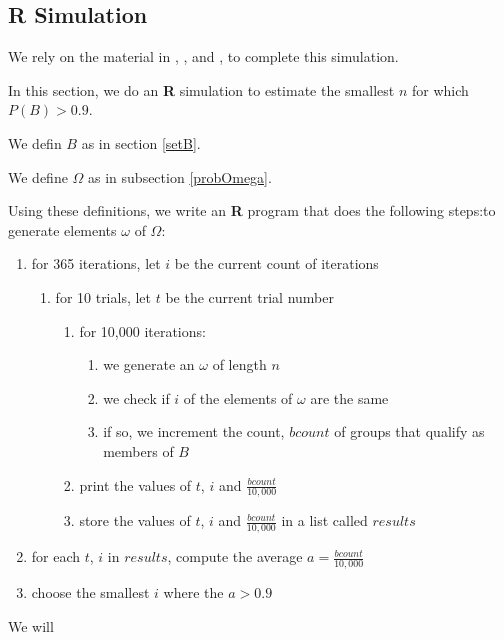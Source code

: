\documentclass[a4paper,11pt]{article}
\begin{document}
\subsection{\textbf{\textsf{R}} Simulation}

We rely on the material in \cite{stackCheckEltsEq}, \cite{rtut1A}, and
\cite{rtut1B}, \cite{RDummies} to complete this simulation.

In this section, we do an \textbf{\textsf{R}} simulation to estimate the
smallest $n$ for which $P\left( B \right) > 0.9$.

We defin $B$ as in section \ref{setB}.

We define $\Omega$ as in subsection \ref{probOmega}.

Using these definitions, we write an \textbf{\textsf{R}} program that 
does the following steps:to generate elements $\omega$ of
$\Omega$:{}
\begin{enumerate}
  \item for 365 iterations, let $i$ be the current count of iterations
  \begin{enumerate}
    \item for 10 trials, let $t$ be the current trial number
    \begin{enumerate}
      \item for 10,000 iterations:
      \begin{enumerate}
        \item we generate an $\omega$ of length $n$
        \item we check if $i$ of the elements of $\omega$ are the same
        \item if so, we increment the count, $bcount$ of groups that qualify as members of $B$
      \end{enumerate}
      \item print the values of $t$, $i$ and $\frac{bcount}{10,000}$
      \item store the values of $t$, $i$ and $\frac{bcount}{10,000}$ in a list called $results$
    \end{enumerate}
  \end{enumerate}
  \item for each $t$, $i$ in $results$, compute the average $a = \frac{bcount}{10,000}$ 
  \item choose the smallest $i$ where the $a > 0.9$
\end{enumerate}

We will  
\begin{lstlisting}

\end{lstlisting}
\printbibliography
\end{document}
